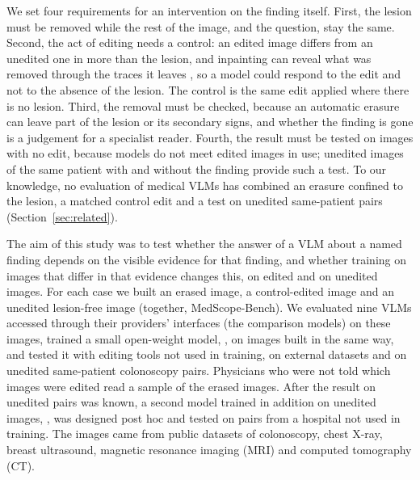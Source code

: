 We set four requirements for an intervention on the finding itself. First, the lesion must be removed while the rest of the image, and the question, stay the same. Second, the act of editing needs a control: an edited image differs from an unedited one in more than the lesion, and inpainting can reveal what was removed through the traces it leaves \citep{rong2022road}, so a model could respond to the edit and not to the absence of the lesion. The control is the same edit applied where there is no lesion. Third, the removal must be checked, because an automatic erasure can leave part of the lesion or its secondary signs, and whether the finding is gone is a judgement for a specialist reader. Fourth, the result must be tested on images with no edit, because models do not meet edited images in use; unedited images of the same patient with and without the finding provide such a test. To our knowledge, no evaluation of medical VLMs has combined an erasure confined to the lesion, a matched control edit and a test on unedited same-patient pairs (Section~\ref{sec:related}).

The aim of this study was to test whether the answer of a VLM about a named finding depends on the visible evidence for that finding, and whether training on images that differ in that evidence changes this, on edited and on unedited images. For each case we built an erased image, a control-edited image and an unedited lesion-free image (together, MedScope-Bench). We evaluated nine VLMs accessed through their providers' interfaces (the comparison models) on these images, trained a small open-weight model, \ms, on images built in the same way, and tested it with editing tools not used in training, on external datasets and on unedited same-patient colonoscopy pairs. Physicians who were not told which images were edited read a sample of the erased images. After the result on unedited pairs was known, a second model trained in addition on unedited images, \msn, was designed post hoc and tested on pairs from a hospital not used in training. The images came from public datasets of colonoscopy, chest X-ray, breast ultrasound, magnetic resonance imaging (MRI) and computed tomography (CT).
